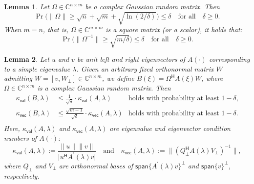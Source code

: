 \documentclass[10pt,a4paper]{amsart}
\newtheorem{lemma}{Lemma}
\newcommand{\C}{\mathbb{C}}
\newcommand{\Htran}{\mathsf{H}}
\providecommand{\abs}[1]{\lvert#1\rvert}
\providecommand{\bignorm}[1]{\bigl\lVert#1\bigr\rVert}
\newcommand{\defi}{:=}
\newcommand{\kval}{\kappa_{\mathsf{val}}}
\newcommand{\kvec}{\kappa_{\mathsf{vec}}}
\providecommand{\norm}[1]{\lVert#1\rVert}
\providecommand{\spa}[1]{\mathsf{span}\{#1\}}
\begin{document}
\begin{lemma}
    \label{lem:Gaussian}
    Let $\Omega\in\C^{n\times m}$ be a complex Gaussian random matrix. Then 
    \begin{equation*}
        \Pr\bigl(\norm{\Omega}\geq \sqrt{n}+\sqrt{m}+\sqrt{\ln(2/\delta)}\bigr)\leq \delta
        \quad\text{for all}\quad \delta\geq 0. 
    \end{equation*}
    When $m=n$, that is, $\Omega\in\C^{m\times m}$ is a square matrix (or a scalar), it holds that:
    \begin{equation*}
        \Pr\bigl(\norm{\Omega^{-1}}\geq \sqrt{m/\delta}\bigr)\leq \delta \quad\text{for all}\quad \delta \geq 0. 
    \end{equation*}
\end{lemma}

\begin{lemma}
    \label{lem:kappa}
    Let $u$ and $v$ be unit left and right eigenvectors of $A(\cdot)$ corresponding to a simple eigenvalue $\lambda$.
    Given an arbitrary fixed orthonormal matrix $W$ admitting $W=[v,W_{\perp}]\in\C^{n\times m}$, we define $B(\xi)=\Omega^{\Htran}A(\xi)W$, where $\Omega\in\C^{n\times m}$ is a complex Gaussian random matrix. Then 
    \begin{equation*}
        \begin{aligned}
                \kval(B,\lambda) &\leq  \frac{1}{\sqrt{\delta}}\cdot \kval(A,\lambda) &\text{holds with probability at least $1-\delta$,}\\ 
                \kvec(B,\lambda) &\leq  \frac{\sqrt{m-1}}{\sqrt{\delta}}\cdot \kvec(A,\lambda) &\text{holds with probability at least $1-\delta$.}\\ 
        \end{aligned}
    \end{equation*}
    Here, $\kval(A,\lambda)$ and $\kvec(A,\lambda)$ are eigenvalue and eigenvector condition numbers of $A(\cdot)$:
    \begin{equation}
        \label{eq:defkappaA}
        \kval(A,\lambda)\defi \frac{\norm{u}\norm{v}}{\abs{u^{\Htran}A^{\prime}(\lambda)v}}
        \quad\text{and}\quad 
        \kvec(A,\lambda)\defi \bignorm{(Q_{\perp}^{\Htran}A(\lambda)V_{\perp})^{-1}},
    \end{equation}
    where $Q_{\perp}$ and $V_{\perp}$ are orthonormal bases of $\spa{A^{\prime}(\lambda)v}^{\perp}$ and $\spa{v}^{\perp}$, respectively.

\end{lemma}
\end{document}
